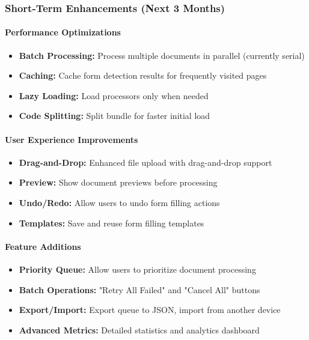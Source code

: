 \documentclass[11pt, a4paper]{article}
\theoremstyle{plain}
\theoremstyle{definition}
\begin{document}
\subsubsection{Short-Term Enhancements (Next 3 Months)}

\paragraph{Performance Optimizations}
\begin{itemize}
    \item \textbf{Batch Processing:} Process multiple documents in parallel (currently serial)
    \item \textbf{Caching:} Cache form detection results for frequently visited pages
    \item \textbf{Lazy Loading:} Load processors only when needed
    \item \textbf{Code Splitting:} Split bundle for faster initial load
\end{itemize}

\paragraph{User Experience Improvements}
\begin{itemize}
    \item \textbf{Drag-and-Drop:} Enhanced file upload with drag-and-drop support
    \item \textbf{Preview:} Show document previews before processing
    \item \textbf{Undo/Redo:} Allow users to undo form filling actions
    \item \textbf{Templates:} Save and reuse form filling templates
\end{itemize}

\paragraph{Feature Additions}
\begin{itemize}
    \item \textbf{Priority Queue:} Allow users to prioritize document processing
    \item \textbf{Batch Operations:} "Retry All Failed" and "Cancel All" buttons
    \item \textbf{Export/Import:} Export queue to JSON, import from another device
    \item \textbf{Advanced Metrics:} Detailed statistics and analytics dashboard
\end{itemize}
\end{document}
